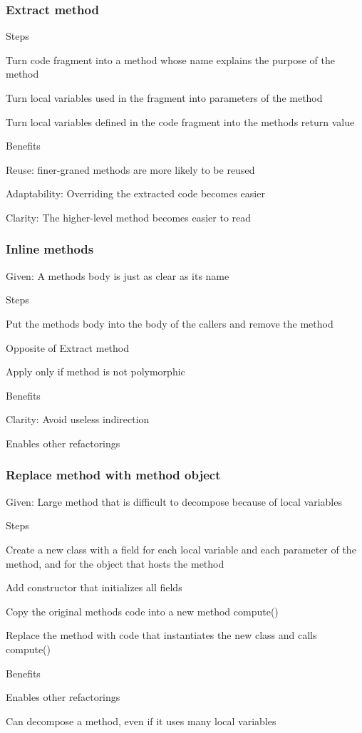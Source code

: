 \documentclass[10pt]{article}
\begin{document}
\subsubsection{Extract method}
\enumstart
	\item Steps
	\enumstart
		\item Turn code fragment into a method whose name explains the purpose of the method
		\item Turn local variables used in the fragment into parameters of the method
		\item Turn local variables defined in the code fragment into the methods return value
	\enumend
	\item Benefits
	\enumstart
		\item Reuse: finer-graned methods are more likely to be reused
		\item Adaptability: Overriding the extracted code becomes easier
		\item Clarity: The higher-level method becomes easier to read
	\enumend
\enumend

\subsubsection{Inline methods}
\enumstart
	\item Given: A methods body is just as clear as its name
	\item Steps
	\enumstart
		\item Put the methods body into the body of the callers and remove the method
	\enumend
	\item Opposite of Extract method
	\item Apply only if method is not polymorphic
	\item Benefits
	\enumstart
		\item Clarity: Avoid useless indirection
		\item Enables other refactorings
	\enumend
\enumend

\subsubsection{Replace method with method object}
\enumstart
	\item Given: Large method that is difficult to decompose because of local variables
	\item Steps
	\enumstart
		\item Create a new class with a field for each local variable and each parameter of the method, and for the object that hosts the method
		\item Add constructor that initializes all fields
		\item Copy the original methods code into a new method compute()
		\item Replace the method with code that instantiates the new class and calls compute()
	\enumend
	\item Benefits
	\enumstart
		\item Enables other refactorings
		\item Can decompose a method, even if it uses many local variables
	\enumend
\enumend
\end{document}
